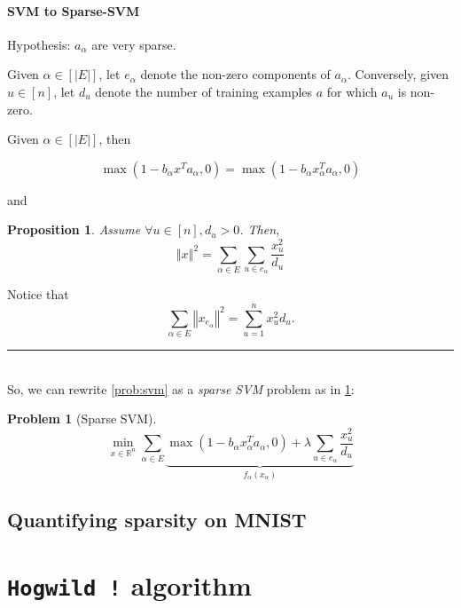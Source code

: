 \documentclass[twoside,11pt]{article}
\newcommand{\norm}[1]{\left\Vert #1 \right\Vert}
\newcommand{\todo}[1]{\textbf{\color{red}{[TODO: #1]}}}
\newcommand{\BlackBox}{\rule{1.5ex}{1.5ex}}  %
\renewenvironment{proof}{\par\noindent{\bf Proof\ }}{\hfill\BlackBox\\[2mm]}
\newtheorem{proposition}[theorem]{Proposition}
\newtheorem{problem}{Problem}
\begin{document}
\paragraph{SVM to Sparse-SVM}

Hypothesis: $a_\alpha$ are very sparse.

Given $\alpha \in [\vert E \vert]$, let $e_\alpha$ denote the non-zero components of $a_\alpha$. Conversely, given $u\in[n]$, let $d_u$ denote the number of training examples $a$ for which $a_u$ is non-zero.

Given $\alpha \in [\vert E\vert]$, then 

\begin{equation}
    \max(1- b_\alpha x^Ta_\alpha, 0) = \max(1- b_\alpha x_\alpha^Ta_\alpha, 0)
\end{equation}

and

\begin{proposition}
    Assume $\forall u \in[n], d_u > 0$. Then,
    \begin{equation}
        \norm{x}^2 = \sum_{\alpha \in E}\sum_{u\in e_\alpha}\frac{x_u^2}{d_u}
    \end{equation}
\end{proposition}

\begin{proof}
    Notice that
    \begin{equation*}
        \sum_{\alpha \in E} \norm{x_{e_\alpha}}^2 = \sum_{u=1}^n x_u^2d_u.
    \end{equation*}
\end{proof}
So, we can rewrite \cref{prob:svm} as a \emph{sparse SVM} problem as in \cref{prob:sparse-svm}:
\begin{problem}[Sparse SVM]\label{prob:sparse-svm}
    \begin{equation*}
        \min_{x\in\mathbb R^n}\sum_{\alpha \in E}\underbrace{\max(1- b_\alpha x_\alpha^Ta_\alpha, 0) + \lambda\sum_{u\in e_\alpha}\frac{x_u^2}{d_u}}_\text{$f_\alpha(x_\alpha)$}
    \end{equation*}
\end{problem}

\subsection{Quantifying sparsity on MNIST}
\todo{Define $\Omega$, $\Delta$ and $\rho$.}

\section{\texttt{Hogwild !} algorithm}
\end{document}
